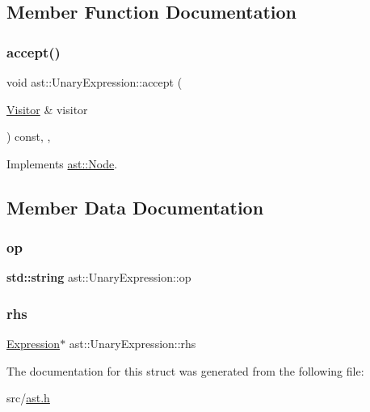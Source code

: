 \subsection{Member Function Documentation}
\mbox{\label{structast_1_1_unary_expression_aa81ebeb7c67923476f15795df9a8892e}} 
\subsubsection{\texorpdfstring{accept()}{accept()}}
{\footnotesize\ttfamily void ast\+::\+Unary\+Expression\+::accept (\begin{DoxyParamCaption}\item[{\hyperlink{structast_1_1_visitor}{Visitor} \&}]{visitor }\end{DoxyParamCaption}) const\hspace{0.3cm}{\ttfamily [inline]}, {\ttfamily [override]}, {\ttfamily [virtual]}}



Implements \hyperlink{structast_1_1_node_abc089ee6caaf06a4445ebdd8391fdebc}{ast\+::\+Node}.



\subsection{Member Data Documentation}
\mbox{\label{structast_1_1_unary_expression_a285fff2867097f1d9f7bb0e14e006e46}} 
\subsubsection{\texorpdfstring{op}{op}}
{\footnotesize\ttfamily \textbf{ std\+::string} ast\+::\+Unary\+Expression\+::op}

\mbox{\label{structast_1_1_unary_expression_a6d3c17a7216b97384823c276d118b6d6}} 
\subsubsection{\texorpdfstring{rhs}{rhs}}
{\footnotesize\ttfamily \hyperlink{structast_1_1_expression}{Expression}$\ast$ ast\+::\+Unary\+Expression\+::rhs}



The documentation for this struct was generated from the following file\+:\begin{DoxyCompactItemize}
\item 
src/\hyperlink{ast_8h}{ast.\+h}\end{DoxyCompactItemize}
